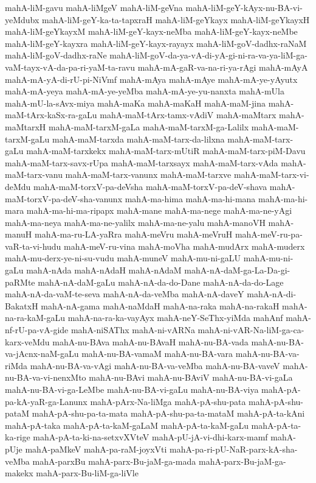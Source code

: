 {mahA-liM-gavu
mahA-liMgeV
mahA-liM-geVna
mahA-liM-geY-kAyx-nu-BA-vi-yeMdubx
mahA-liM-geY-ka-ta-tapxraH
mahA-liM-geYkayx
mahA-liM-geYkayxH
mahA-liM-geYkayxM
mahA-liM-geY-kayx-neMba
mahA-liM-geY-kayx-neMbe
mahA-liM-geY-kayxra
mahA-liM-geY-kayx-rayayx
mahA-liM-goV-dadhx-raNaM
mahA-liM-goV-dadhx-raNe
mahA-liM-goV-da-ya-vA-di-yA-gi-ni-ra-va-ya-liM-ga-vaM-tayx-vA-da-pa-ri-yaM-ta-ravu
mahA-mA-gaR-va-na-ri-ya-rAgi
mahA-mAyA
mahA-mA-yA-di-rU-pi-NiVmf
mahA-mAya
mahA-mAye
mahA-mA-ye-yAyutx
mahA-mA-yeya
mahA-mA-ye-yeMba
mahA-mA-ye-yu-nanxta
mahA-mUla
mahA-mU-la-sAvx-miya
mahA-maKa
mahA-maKaH
mahA-maM-jina
mahA-maM-tArx-kaSx-ra-gaLu
mahA-maM-tArx-tamx-vAdiV
mahA-maMtarx
mahA-maMtarxH
mahA-maM-tarxM-gaLa
mahA-maM-tarxM-ga-Lalilx
mahA-maM-tarxM-gaLu
mahA-maM-tarxda
mahA-maM-tarx-da-lilxna
mahA-maM-tarx-gaLu
mahA-maM-tarxkekx
mahA-maM-tarx-mUtiR
mahA-maM-tarx-piM-Davu
mahA-maM-tarx-savx-rUpa
mahA-maM-tarxsayx
mahA-maM-tarx-vAda
mahA-maM-tarx-vanu
mahA-maM-tarx-vanunx
mahA-maM-tarxve
mahA-maM-tarx-vi-deMdu
mahA-maM-torxV-pa-deVsha
mahA-maM-torxV-pa-deV-shava
mahA-maM-torxV-pa-deV-sha-vanunx
mahA-ma-hima
mahA-ma-hi-mana
mahA-ma-hi-mara
mahA-ma-hi-ma-ripapx
mahA-mane
mahA-ma-nege
mahA-ma-ne-yAgi
mahA-ma-neya
mahA-ma-ne-yalilx
mahA-ma-ne-yalu
mahA-manoVH
mahA-manuH
mahA-ma-ru-LA-yaRra
mahA-meVru
mahA-meVruH
mahA-meV-ru-pa-vaR-ta-vi-hudu
mahA-meV-ru-vina
mahA-moVha
mahA-mudArx
mahA-muderx
mahA-mu-derx-ye-ni-su-vudu
mahA-muneV
mahA-mu-ni-gaLU
mahA-mu-ni-gaLu
mahA-nAda
mahA-nAdaH
mahA-nAdaM
mahA-nA-daM-ga-La-Da-gi-paRMte
mahA-nA-daM-gaLu
mahA-nA-da-do-Dane
mahA-nA-da-do-Lage
mahA-nA-da-vaM-te-seva
mahA-nA-da-veMba
mahA-nA-daveY
mahA-nA-di-BakatxH
mahA-nA-gama
mahA-naMdaH
mahA-na-raka
mahA-na-rakaH
mahA-na-ra-kaM-gaLu
mahA-na-ra-ka-vayAyx
mahA-neY-SeThx-yiMda
mahAnf
mahA-nf-rU-pa-vA-gide
mahA-niSAThx
mahA-ni-vARNa
mahA-ni-vAR-Na-liM-ga-ca-karx-veMdu
mahA-nu-BAva
mahA-nu-BAvaH
mahA-nu-BA-vada
mahA-nu-BA-va-jAcnx-naM-gaLu
mahA-nu-BA-vamaM
mahA-nu-BA-vara
mahA-nu-BA-va-riMda
mahA-nu-BA-va-vAgi
mahA-nu-BA-va-veMba
mahA-nu-BA-vaveV
mahA-nu-BA-va-vi-nenxMto
mahA-nu-BAvi
mahA-nu-BAviV
mahA-nu-BA-vi-gaLa
mahA-nu-BA-vi-ga-LeMbe
mahA-nu-BA-vi-gaLu
mahA-nu-BA-viya
mahA-pA-pa-kA-yaR-ga-Lanunx
mahA-pArx-Na-liMga
mahA-pA-shu-pata
mahA-pA-shu-pataM
mahA-pA-shu-pa-ta-mata
mahA-pA-shu-pa-ta-mataM
mahA-pA-ta-kAni
mahA-pA-taka
mahA-pA-ta-kaM-gaLaM
mahA-pA-ta-kaM-gaLu
mahA-pA-ta-ka-rige
mahA-pA-ta-ki-na-setxvXVteV
mahA-pU-jA-vi-dhi-karx-mamf
mahA-pUje
mahA-paMkeV
mahA-pa-raM-joyxVti
mahA-pa-ri-pU-NaR-parx-kA-sha-veMba
mahA-parxBu
mahA-parx-Bu-jaM-ga-mada
mahA-parx-Bu-jaM-ga-makekx
mahA-parx-Bu-liM-ga-liVle
}
